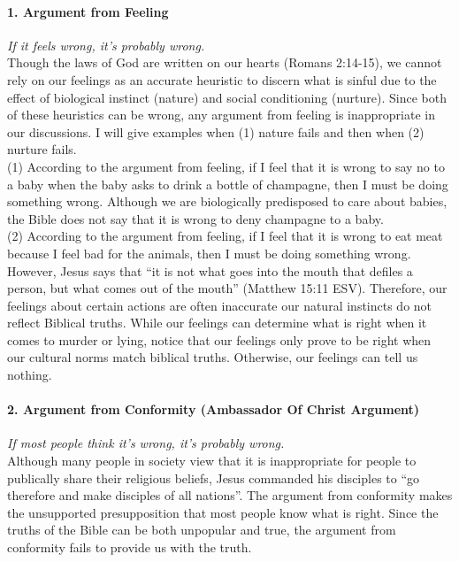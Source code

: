 \documentclass[a4paper, 12pt]{article}
\begin{document}
\paragraph{1. Argument from Feeling} \textit{If it feels wrong, it's probably wrong.} \\
Though the laws of God are written on our hearts (Romans 2:14-15), we cannot rely on our feelings as an accurate heuristic to discern what is sinful due to the effect of biological instinct (nature) and social conditioning (nurture). Since both of these heuristics can be wrong, any argument from feeling is inappropriate in our discussions. I will give examples when (1) nature fails and then when (2) nurture fails. \\
\break
(1) According to the argument from feeling, if I feel that it is wrong to say no to a baby when the baby asks to drink a bottle of champagne, then I must be doing something wrong. Although we are biologically predisposed to care about babies, the Bible does not say that it is wrong to deny champagne to a baby. \\
\break
(2) According to the argument from feeling, if I feel that it is wrong to eat meat because I feel bad for the animals, then I must be doing something wrong. However, Jesus says that ``it is not what goes into the mouth that defiles a person, but what comes out of the mouth'' (Matthew 15:11 ESV). Therefore, our feelings about certain actions are often inaccurate our natural instincts do not reflect Biblical truths. While our feelings can determine what is right when it comes to murder or lying, notice that our feelings only prove to be right when our cultural norms match biblical truths. Otherwise, our feelings can tell us nothing. \\
\paragraph{2. Argument from Conformity (Ambassador Of Christ Argument)} \textit{If most people think it's wrong, it's probably wrong.} \\
Although many people in society view that it is inappropriate for people to publically share their religious beliefs, Jesus commanded his disciples to ``go therefore and make disciples of all nations''. The argument from conformity makes the unsupported presupposition that most people know what is right. Since the truths of the Bible can be both unpopular and true, the argument from conformity fails to provide us with the truth. \\
\pagebreak
\end{document}
